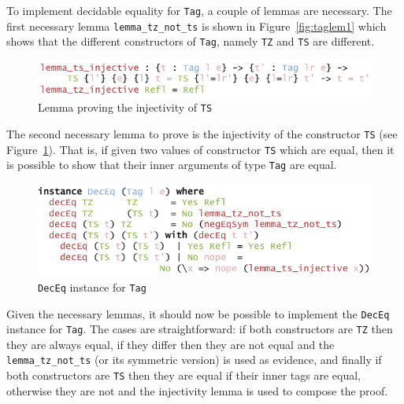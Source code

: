 \documentclass{ituthesis}
\newcommand{\ttconstructor}[1]{\textcolor{constructor-color}{\texttt{#1}}}
\newcommand{\tttype}[1]{\textcolor{type-color}{\texttt{#1}}}
\newcommand{\ttdec}[1]{\textcolor{declared-var-color}{\texttt{#1}}}
\theoremstyle{break}
\begin{document}
To implement decidable equality for \tttype{Tag}, a couple of lemmas are necessary.
The first necessary lemma \ttdec{lemma\_tz\_not\_ts} is shown in Figure~\ref{fig:taglem1} which shows that the different constructors of \tttype{Tag}, namely \ttconstructor{TZ} and \ttconstructor{TS} are different.

\begin{figure}[ht]
\begin{center}
    \includegraphics[scale=0.5]{Figures/TagDecEqLemma2.png}
\end{center}
\caption{Lemma proving the injectivity of \ttconstructor{TS}}
\label{fig:taglem2}
\end{figure}

The second necessary lemma to prove is the injectivity of the constructor \ttconstructor{TS} (see Figure~\ref{fig:taglem2}).
That is, if given two values of constructor \ttconstructor{TS} which are equal, then it is possible to show that their inner arguments of type \tttype{Tag} are equal.

\begin{figure}[ht]
\begin{center}
    \includegraphics[scale=0.5]{Figures/TagDecEqLemmaInstance.png}
\end{center}
\caption{\tttype{DecEq} instance for \tttype{Tag}}
\label{fig:tagdeceqinst}
\end{figure}

Given the necessary lemmas, it should now be possible to implement the \tttype{DecEq} instance for \tttype{Tag}.
The cases are straightforward: if both constructors are \ttconstructor{TZ} then they are always equal, if they differ then they are not equal
and the \ttdec{lemma\_tz\_not\_ts} (or its symmetric version) is used as evidence, and finally if both constructors are \ttconstructor{TS} then they are equal
if their inner tags are equal, otherwise they are not and the injectivity lemma is used to compose the proof.
\end{document}
